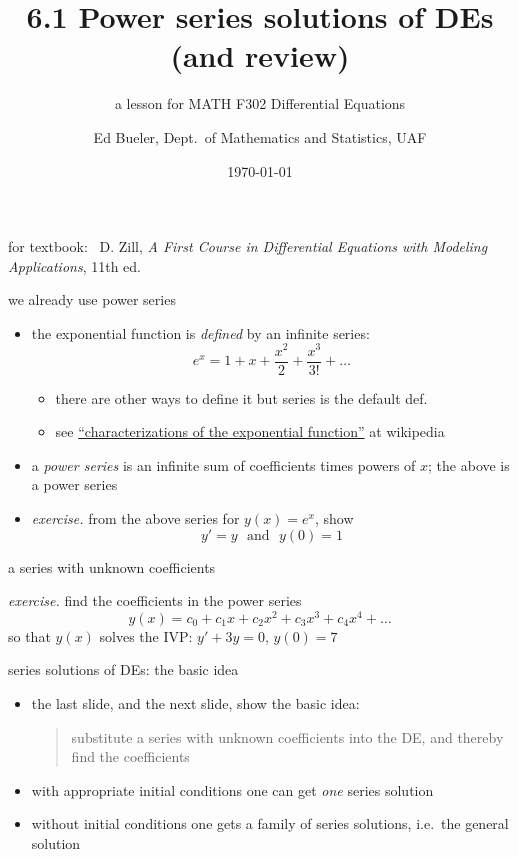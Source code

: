 \documentclass[urlcolor=blue,dvipsnames]{beamer}
\title{6.1 Power series solutions of DEs \\ (and review)}
\subtitle{a lesson for MATH F302 Differential Equations}
\author{Ed Bueler, Dept.~of Mathematics and Statistics, UAF}
\date{\tiny \today}
\begin{document}


\begin{frame}
\titlepage

\centerline{\tiny for textbook: \, D. Zill, \emph{A First Course in Differential Equations with Modeling Applications}, 11th ed.}
\end{frame}


\begin{frame}{we already use power series}

\begin{itemize}
\item the exponential function is \emph{defined} by an infinite series:
    $$e^x = 1 + x + \frac{x^2}{2} + \frac{x^3}{3!} + \dots$$
    \begin{itemize}
    \item there are other ways to define it but series is the default def.
    \item see \href{https://en.wikipedia.org/wiki/Characterizations_of_the_exponential_function}{``characterizations of the exponential function''} at wikipedia
    \end{itemize}
\item a \emph{power series} is an infinite sum of coefficients times powers of $x$; the above is a power series
\item \emph{exercise.} from the above series for $y(x)=e^x$, show
    $$y'=y \,\, \text{ and } \,\, y(0)=1$$
\end{itemize}

\vspace{30mm}
\end{frame}


\begin{frame}{a series with unknown coefficients}

\noindent \emph{exercise.}  find the coefficients in the power series
    $$y(x) = c_0 + c_1 x + c_2 x^2 + c_3 x^3 + c_4 x^4 + \dots$$
so that $y(x)$ solves the IVP: \hfill $y'+3y=0, \, y(0) = 7$

\vspace{60mm}
\end{frame}


\begin{frame}{series solutions of DEs: the basic idea}

\begin{itemize}
\item the last slide, and the next slide, show the basic idea:

\medskip
\begin{quotation}
\noindent \alert{substitute a series with unknown coefficients into the DE, and thereby find the coefficients}
\end{quotation}

\item with appropriate initial conditions one can get \emph{one} series solution
\item without initial conditions one gets a family of series solutions, i.e.~the general solution
\end{itemize}
\end{frame}
\end{document}
